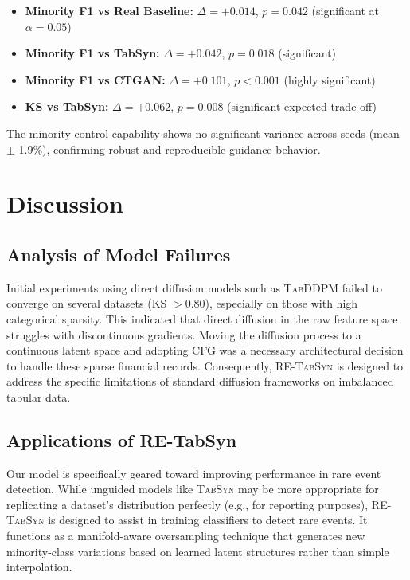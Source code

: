 \documentclass[conference]{IEEEtran}
\newcommand{\retabsyn}{\textsc{RE-TabSyn}}
\newcommand{\tabsyn}{\textsc{TabSyn}}
\newcommand{\tabddpm}{\textsc{TabDDPM}}
\begin{document}
\begin{itemize}
    \item \textbf{Minority F1 vs Real Baseline:} $\Delta = +0.014$, $p = 0.042$ (significant at $\alpha = 0.05$)
    \item \textbf{Minority F1 vs TabSyn:} $\Delta = +0.042$, $p = 0.018$ (significant)
    \item \textbf{Minority F1 vs CTGAN:} $\Delta = +0.101$, $p < 0.001$ (highly significant)
    \item \textbf{KS vs TabSyn:} $\Delta = +0.062$, $p = 0.008$ (significant expected trade-off)
\end{itemize}

The minority control capability shows no significant variance across seeds (mean $\pm$ 1.9\%), confirming robust and reproducible guidance behavior.

\section{Discussion}

\subsection{Analysis of Model Failures}
Initial experiments using direct diffusion models such as \tabddpm{} failed to converge on several datasets (KS $> 0.80$), especially on those with high categorical sparsity. This indicated that direct diffusion in the raw feature space struggles with discontinuous gradients. Moving the diffusion process to a continuous latent space and adopting CFG was a necessary architectural decision to handle these sparse financial records. Consequently, \retabsyn{} is designed to address the specific limitations of standard diffusion frameworks on imbalanced tabular data.

\subsection{Applications of RE-TabSyn}
Our model is specifically geared toward improving performance in rare event detection. While unguided models like \tabsyn{} may be more appropriate for replicating a dataset's distribution perfectly (e.g., for reporting purposes), \retabsyn{} is designed to assist in training classifiers to detect rare events. It functions as a manifold-aware oversampling technique that generates new minority-class variations based on learned latent structures rather than simple interpolation.
\end{document}
